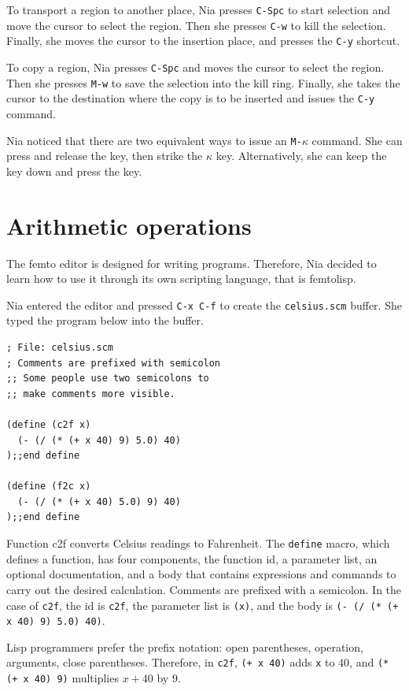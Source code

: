 \documentclass[a4paper,12pt]{book}
\begin{document}
To transport a region to another place, Nia presses \verb|C-Spc| to start selection and move the cursor to select the region. Then she presses \verb|C-w| to kill the selection. Finally, she moves the cursor to the insertion place, and presses the \verb|C-y| shortcut.

To copy a region, Nia presses \verb|C-Spc| and moves the cursor to select the region. Then she presses \verb|M-w| to save the selection into the kill ring. Finally, she takes the cursor to the destination where the copy is to be inserted and issues the \verb|C-y| command.

Nia noticed that there are two equivalent ways to
issue an \verb|M-|$\kappa$ command. She can
press and release the  key, then
strike the  $\kappa$ key. Alternatively, she
can keep the  key down and press
the \keys{$\kappa$} key.


\chapter{Arithmetic operations}
The femto editor is designed for writing programs.
 Therefore, Nia decided
to learn how to use it through its own scripting language,
that is femtolisp.

Nia entered the editor and pressed \verb|C-x C-f| 
to create the \verb|celsius.scm| buffer. 
She typed the  program below into the buffer. 
\begin{verbatim}
; File: celsius.scm
; Comments are prefixed with semicolon
;; Some people use two semicolons to
;; make comments more visible.

(define (c2f x)
  (- (/ (* (+ x 40) 9) 5.0) 40)
);;end define

(define (f2c x)
  (- (/ (* (+ x 40) 5.0) 9) 40)
);;end define
\end{verbatim}
Function c2f converts Celsius readings to Fahrenheit.
The \verb|define| macro, which defines a function, 
has four components, the function id, a parameter list,
an optional documentation, and a body that contains
expressions and commands to carry out the desired
calculation. Comments are prefixed with a semicolon.
In the case of \verb|c2f|, the id is \verb|c2f|,
the parameter list is \verb|(x)|, and the body 
is \verb|(- (/ (* (+ x 40) 9) 5.0) 40)|.

Lisp programmers prefer the prefix notation:
open parentheses, operation, arguments, close parentheses.
Therefore, in  \verb|c2f|,  \verb|(+ x 40)|
adds \verb|x| to 40, and \verb|(* (+ x 40) 9)| multiplies $x+40$ by 9.
\end{document}
